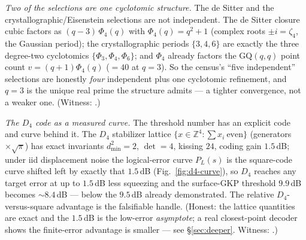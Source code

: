 \documentclass[11pt]{article}
\begin{document}
\emph{Two of the selections are one cyclotomic structure.} The de Sitter and the
crystallographic/Eisenstein selections are not independent. The de Sitter closure
cubic factors as $(q-3)\,\Phi_4(q)$ with $\Phi_4(q)=q^2+1$ (complex roots $\pm i=
\zeta_4$, the Gaussian period); the crystallographic periods $\{3,4,6\}$ are exactly
the three degree-two cyclotomics $\{\Phi_3,\Phi_4,\Phi_6\}$; and $\Phi_4$ already
factors the $\mathrm{GQ}(q,q)$ point count $v=(q+1)\Phi_4(q)$ ($=40$ at $q=3$). So the
census's ``five independent'' selections are honestly \emph{four} independent plus
one cyclotomic refinement, and $q=3$ is the unique real prime the structure admits ---
a tighter convergence, not a weaker one. (Witness:
.)

\emph{The $D_4$ code as a measured curve.} The threshold number has an explicit code
and curve behind it. The $D_4$ stabilizer lattice $\{x\in\mathbb Z^4:\sum x_i\ \text{even}\}$
(generators $\times\sqrt\pi$) has exact invariants $d_{\min}^2=2$, $\det=4$, kissing
$24$, coding gain $1.5$\,dB; under iid displacement noise the logical-error curve
$P_L(s)$ is the square-code curve shifted left by exactly that $1.5$\,dB
(Fig.~\ref{fig:d4-curve}), so $D_4$ reaches any target error at up to $1.5$\,dB less
squeezing and the surface-GKP threshold $9.9$\,dB becomes $\sim8.4$\,dB --- below the
$9.5$\,dB already demonstrated. The relative $D_4$-versus-square advantage is the
falsifiable handle. (Honest: the lattice quantities are exact and the $1.5$\,dB is the
low-error \emph{asymptote}; a real closest-point decoder shows the finite-error
advantage is smaller --- see \S\ref{sec:deeper}. Witness:
.)
\end{document}
